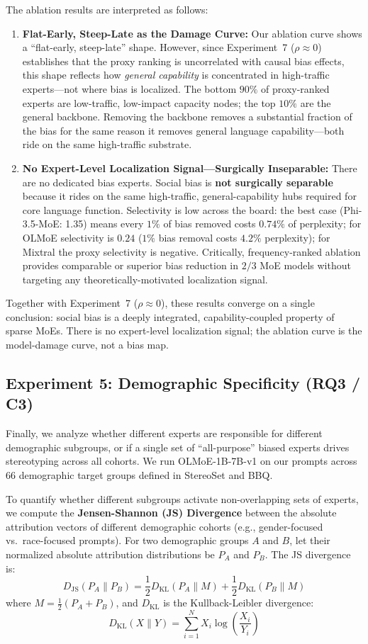 \documentclass[11pt,a4paper]{article}
\begin{document}
The ablation results are interpreted as follows:
\begin{enumerate}
    \item \textbf{Flat-Early, Steep-Late as the Damage Curve:} Our ablation curve shows a ``flat-early, steep-late'' shape. However, since Experiment~7 ($\rho \approx 0$) establishes that the proxy ranking is uncorrelated with causal bias effects, this shape reflects how \textit{general capability} is concentrated in high-traffic experts—not where bias is localized. The bottom $90\%$ of proxy-ranked experts are low-traffic, low-impact capacity nodes; the top $10\%$ are the general backbone. Removing the backbone removes a substantial fraction of the bias for the same reason it removes general language capability—both ride on the same high-traffic substrate.
    \item \textbf{No Expert-Level Localization Signal—Surgically Inseparable:} There are no dedicated bias experts. Social bias is \textbf{not surgically separable} because it rides on the same high-traffic, general-capability hubs required for core language function. Selectivity is low across the board: the best case (Phi-3.5-MoE: 1.35) means every $1\%$ of bias removed costs $0.74\%$ of perplexity; for OLMoE selectivity is $0.24$ ($1\%$ bias removal costs $4.2\%$ perplexity); for Mixtral the proxy selectivity is negative. Critically, frequency-ranked ablation provides comparable or superior bias reduction in $2/3$ MoE models without targeting any theoretically-motivated localization signal.
\end{enumerate}
Together with Experiment~7 ($\rho \approx 0$), these results converge on a single conclusion: social bias is a deeply integrated, capability-coupled property of sparse MoEs. There is no expert-level localization signal; the ablation curve is the model-damage curve, not a bias map.

\subsection{Experiment 5: Demographic Specificity (RQ3 / C3)}
Finally, we analyze whether different experts are responsible for different demographic subgroups, or if a single set of ``all-purpose'' biased experts drives stereotyping across all cohorts. We run OLMoE-1B-7B-v1 on our prompts across 66 demographic target groups defined in StereoSet and BBQ.

To quantify whether different subgroups activate non-overlapping sets of experts, we compute the \textbf{Jensen-Shannon (JS) Divergence} between the absolute attribution vectors of different demographic cohorts (e.g., gender-focused vs.\ race-focused prompts). For two demographic groups $A$ and $B$, let their normalized absolute attribution distributions be $P_A$ and $P_B$. The JS divergence is:
$$D_{\text{JS}}(P_A \parallel P_B) = \frac{1}{2} D_{\text{KL}}(P_A \parallel M) + \frac{1}{2} D_{\text{KL}}(P_B \parallel M)$$
where $M = \frac{1}{2}(P_A + P_B)$, and $D_{\text{KL}}$ is the Kullback-Leibler divergence:
$$D_{\text{KL}}(X \parallel Y) = \sum_{i=1}^N X_i \log \left(\frac{X_i}{Y_i} \right)$$
\end{document}
